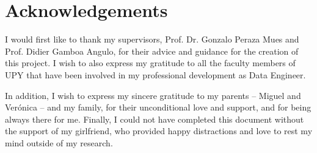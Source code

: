 \chapter{Acknowledgements}
\label{cha:acknowledgments}

I would first like to thank my supervisors, Prof. Dr. Gonzalo Peraza Mues and Prof. Didier Gamboa Angulo, for their advice and guidance for the creation of this project. I wish to also express my gratitude to all the faculty members of UPY that have been involved in my professional development as Data Engineer.

In addition, I wish to express my sincere gratitude to my parents -- Miguel and Verónica -- and my family, for their unconditional love and support, and for being always there for me. Finally, I could not have completed this document without the support of my girlfriend, who provided happy distractions and love to rest my mind outside of my research.




